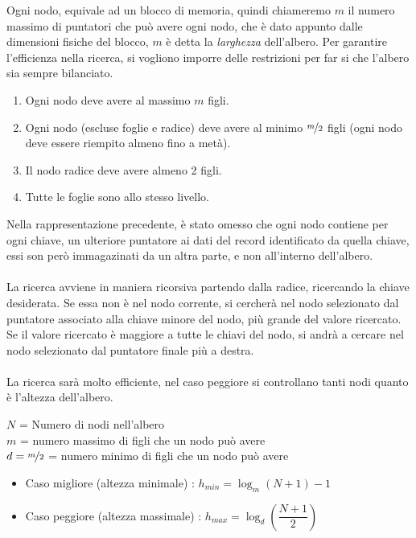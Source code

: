 \documentclass[12pt, letterpaper]{article}
\newcommand{\acc}{\\\hphantom{}\\}
\begin{document}
Ogni nodo, equivale ad un blocco di memoria, quindi chiameremo \(m\) il numero massimo di puntatori che può 
avere ogni nodo, che è dato appunto dalle dimensioni fisiche del blocco, \(m\) è detta la \textit{larghezza} 
dell'albero. Per garantire l'efficienza nella ricerca, si vogliono imporre delle restrizioni per far si che 
l'albero sia sempre bilanciato.\begin{enumerate}
    \item Ogni nodo deve avere al massimo \(m\) figli.
    \item Ogni nodo (escluse foglie e radice) deve avere al minimo \(\nicefrac{m}{2}\) figli (ogni nodo deve essere 
    riempito almeno fino a metà).
    \item Il nodo radice deve avere almeno 2 figli.
    \item Tutte le foglie sono allo stesso livello.
\end{enumerate}
Nella rappresentazione precedente, è stato omesso che ogni nodo contiene per ogni chiave, un ulteriore puntatore ai 
dati del record identificato da quella chiave, essi son però immagazinati da un altra parte, e non all'interno dell'albero.\acc 
La ricerca avviene in maniera ricorsiva partendo dalla radice, ricercando la chiave desiderata. Se essa non è 
nel nodo corrente, si cercherà nel nodo selezionato dal puntatore associato alla chiave minore del nodo, più grande del valore ricercato. 
Se il valore ricercato è maggiore a tutte le chiavi del nodo, si andrà a cercare nel nodo selezionato dal puntatore finale più a destra.\acc 
La ricerca sarà molto efficiente, nel caso peggiore si controllano tanti nodi quanto è l'altezza dell'albero.
\begin{center}
    \(N\) = Numero di nodi nell'albero\\ \(m\) = numero massimo di figli che un nodo può avere\\
    \(d=\nicefrac{m}{2}\) =  numero minimo di figli che un nodo può avere
\end{center}
\begin{itemize}
    \item Caso migliore (altezza minimale) : \(h_{min}=\log_m(N+1)-1\)
    \item Caso peggiore (altezza massimale) : \(h_{max}=\log_d(\dfrac{N+1}{2})\)
\end{itemize}\newpage
\end{document}
